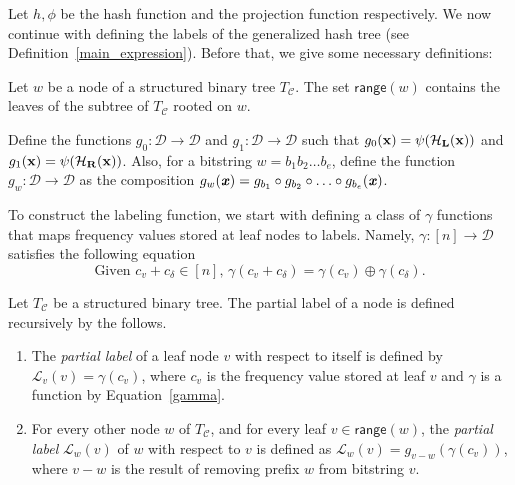 \label{com_lab}
Let $h, \phi$ be the hash function and the projection function respectively.
We now continue with defining the labels of the generalized hash tree (see Definition~\ref{main_expression}). Before that, we give some necessary definitions:

\begin{defn}
Let $w$ be a node of a structured binary tree $T_{\mathcal{C}}$. The set $\mathsf{range}(w)$ contains the leaves of the subtree of $T_{\mathcal{C}}$ rooted on $w$.
\end{defn}

\begin{defn}\label{compose_def}
Define the functions $g_0: \mathcal{D} \rightarrow \mathcal{D}$ and $g_1:\mathcal{D}\rightarrow \mathcal{D}$ such that 
$g_{0}({\bf x})={\psi}({\bf {\bf {\cal H}_{L}}}({\bf x}))$ and $g_{1}({\bf x})={\psi}({\bf {\cal H}_{R}}({\bf x}))$. Also, for a bitstring $w=b_1b_2\ldots b_e$, define the function $g_w:\mathcal{D} \rightarrow \mathcal{D}$ as the composition $g_w(\textbf{\emph{x}})=g_{b_1} \circ g_{b_2}\circ\ldots \circ g_{b_e}(\textbf{\emph{x}})$.
\end{defn}
To construct the labeling function, we start with defining a class of $\gamma$ functions that maps frequency values stored at leaf nodes to labels. Namely, $\gamma: [n] \rightarrow \mathcal{D}$ satisfies the following equation
\begin{equation}\label{gamma}
\text{Given $c_{v}+c_{\delta} \in [n]$,  } \gamma (c_{v}+c_{\delta}) =\gamma (c_{v}) \oplus \gamma (c_{\delta}).
 \end{equation}

 \begin{defn}\label{weight_of_a_node} Let $T_{\mathcal{C}}$ be a structured binary tree. The partial label of a node is defined recursively by the follows.
\begin{enumerate}
\item The \emph{partial label} of a leaf node $v$ with respect to itself is defined by $\mathcal{L}_v(v)= \gamma (c_{v})$, where $c_v$ is the frequency value stored at leaf $v$ and $\gamma$ is a function by Equation~\ref{gamma}.
\item For every other node $w$ of $T_{\mathcal{C}}$, and for every leaf $v\in \mathsf{range}(w)$, the \emph{partial label} $\mathcal{L}_w(v)$ of $w$ with respect to $v$ is defined as $\mathcal{L}_w(v) = g_{v-w}(\gamma (c_{v}))$, where $v-w$ is the result of removing prefix $w$ from bitstring $v$.  
\end{enumerate}
\end{defn}

